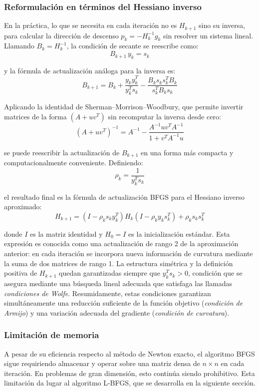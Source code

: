 \subsubsection*{Reformulación en términos del Hessiano inverso}

En la práctica, lo que se necesita en cada iteración no es \(H_{k+1}\) sino su inversa, para calcular la dirección de descenso \(p_k = -H_k^{-1} g_k\) sin resolver un sistema lineal. Llamando \(B_k = H_k^{-1}\), la condición de secante se reescribe como:
\[
B_{k+1}\, y_k = s_k
\]

y la fórmula de actualización análoga para la inversa es:
\[
B_{k+1}
=
B_k
+
\frac{y_k y_k^T}{y_k^T s_k}
-
\frac{B_k s_k s_k^T B_k}{s_k^T B_k s_k}
\]

Aplicando la identidad de Sherman--Morrison--Woodbury, que permite invertir matrices de la forma \((A + uv^T)\) sin recomputar la inversa desde cero:
\[
(A + uv^T)^{-1} = A^{-1} - \frac{A^{-1}uv^T A^{-1}}{1 + v^T A^{-1} u}
\]

se puede reescribir la actualización de \(B_{k+1}\) en una forma más compacta y computacionalmente conveniente. Definiendo:
\[
\rho_k = \frac{1}{y_k^T s_k}
\]

el resultado final es la fórmula de actualización BFGS para el Hessiano inverso aproximado:
\[
\boxed{
H_{k+1}
=
\left(I - \rho_k s_k y_k^T\right)
H_k
\left(I - \rho_k y_k s_k^T\right)
+
\rho_k s_k s_k^T
}
\]

donde \(I\) es la matriz identidad y \(H_0 = I\) es la inicialización estándar. Esta expresión es conocida como una actualización de rango 2 de la aproximación anterior: en cada iteración se incorpora nueva información de curvatura mediante la suma de dos matrices de rango 1. La estructura simétrica y la definición positiva de \(H_{k+1}\) quedan garantizadas siempre que \(y_k^T s_k > 0\), condición que se asegura mediante una búsqueda lineal adecuada que satisfaga las llamadas \textit{condiciones de Wolfe}. Resumidamente, estas condiciones garantizan simultáneamente una reducción suficiente de la función objetivo (\textit{condición de Armijo}) y una variación adecuada del gradiente (\textit{condición de curvatura}).

\subsubsection*{Limitación de memoria}

A pesar de su eficiencia respecto al método de Newton exacto, el algoritmo BFGS sigue requiriendo almacenar y operar sobre una matriz densa de \(n \times n\) en cada iteración. En problemas de gran dimensión, esto continúa siendo prohibitivo. Esta limitación da lugar al algoritmo L-BFGS, que se desarrolla en la siguiente sección.